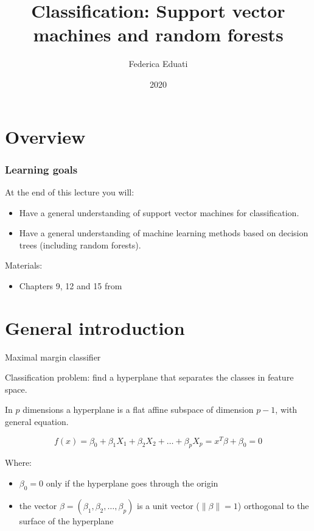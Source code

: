 \documentclass[notes]{beamer}          %
\title{Classification: Support vector machines and random forests}
\author{Federica Eduati}
\institute{Eindhoven University of Technology

Department of Biomedical Engineering}
\date{2020}
\newcommand{\norm}[1]{\left\lVert#1\right\rVert}
\providecommand{\norm}[1]{\lVert#1\rVert}
\begin{document}
 
\frame{\titlepage}
 
\section{Overview}

\begin{frame}
\frametitle{Learning goals}
At the end of this lecture you will:
\begin{itemize}
    \item Have a general understanding of support vector machines for classification.
    \item Have a general understanding of machine learning methods based on decision trees (including random forests).
\end{itemize}

\vspace{5mm} 

Materials: 
\begin{itemize}
    \item Chapters 9, 12 and 15 from \cite{elements}
\end{itemize}

\end{frame}


\section{General introduction}
\begin{frame}{Maximal margin classifier}

Classification problem: find a hyperplane that separates the classes in feature space.

\vspace{5mm} 

In $p$ dimensions a hyperplane is a flat affine subspace of dimension $p-1$, with general equation.

\begin{equation}
    f(x) = \beta_0 + \beta_1 X_1 + \beta_2 X_2 + \dots + \beta_p X_p = x^T\beta + \beta_0 = 0
\end{equation}

Where:
\begin{itemize}
    \item $\beta_0 = 0$ only if the hyperplane goes through the origin \item the vector $\beta = (\beta_1, \beta_2, \dots, \beta_p)$ is a unit vector ($\norm{\beta} = 1$) orthogonal to the surface of the hyperplane
\end{itemize}
    
\end{frame}
\end{document}
